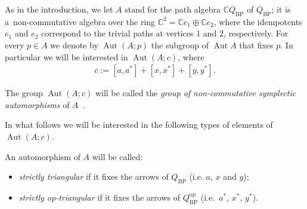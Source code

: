 \documentclass[pdftex]{sigma}
\newcommand{\bb}[1]{\mathbb{#1}}
\newcommand{\ol}[1]{\overline{#1}}
\DeclareMathOperator{\Aut}{Aut}
\begin{document}
As in the introduction, we let \(A\) stand for the path algebra \(\bb{C}\ol{Q}_{\mathrm{BP}}\) of
\(\ol{Q}_{\mathrm{BP}}\); it is a~non-commutative algebra over the ring \(\bb{C}^{2} = \bb{C}e_{1} \oplus
\bb{C}e_{2}\), where the idempotents \(e_{1}\) and \(e_{2}\) correspond to the trivial paths at vertices
\(1\) and \(2\), respectively.
For every \(p\in A\) we denote by \(\Aut (A;p)\) the subgroup of \(\Aut A\) that f\/ixes \(p\).
In particular we will be interested in \(\Aut (A;c)\), where
\begin{gather*}
c\mathrel{:=}[a,a^{*}]+[x,x^{*}]+[y,y^{*}].
\end{gather*}

\begin{definition}
The group \(\Aut (A;c)\) will be called the \textit{group of non-commutative symplectic automorphisms} of
\(A\)~\cite{bp08, kont93}.
\end{definition}

In what follows we will be interested in the following types of elements of \(\Aut (A;c)\).
\begin{definition}
An automorphism of \(A\) will be called:
\begin{itemize}\itemsep=0pt
\item \textit{strictly triangular} if it f\/ixes the arrows of \(Q_{\mathrm{BP}}\) (i.e.
\(a\), \(x\) and \(y\));
\item \textit{strictly op-triangular} if it f\/ixes the arrows of
\(Q_{\mathrm{BP}}^{\mathrm{op}}\) (i.e.\
\(a^{*}\), \(x^{*}\), \(y^{*}\)).
\end{itemize}
\end{definition}
\end{document}
